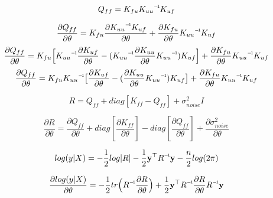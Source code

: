 \documentclass{article}
\newcommand\inv[1]{#1\raisebox{1.15ex}{$\scriptscriptstyle-\!1$}}
\begin{document}
  \begin{equation}
    Q_{ff} = K_{fu}  \inv{K_{uu}}  K_{uf}
  \end{equation}

  \begin{equation}
    \frac{\partial Q_{ff}}{\partial \theta} =
      K_{fu}  \frac{\partial {\inv{K_{uu}}  K_{uf}}}{\partial \theta} +
      {\frac{\partial K_{fu}}{\partial \theta}}  {\inv{K_{uu}}  K_{uf}}
  \end{equation}
  \begin{equation}
    \frac{\partial Q_{ff}}{\partial \theta} =
      K_{fu}  \Big[ \inv{K_{uu}}  \frac{\partial K_{uf}}{\partial \theta}  -
        (\inv{K_{uu}}  \frac{\partial K_{uu}}{\partial \theta}  \inv{K_{uu}})  K_{uf}
        \Big] +
        \frac{\partial K_{fu}}{\partial \theta}  \inv{K_{uu}}  K_{uf}
  \end{equation}
  \begin{equation}
    \frac{\partial Q_{ff}}{\partial \theta} =
      K_{fu}  \inv{K_{uu}}  \big[ \frac{\partial K_{uf}}{\partial \theta}  -
        (\frac{\partial K_{uu}}{\partial \theta}  \inv{K_{uu}})  K_{uf}
        \big] +
        \frac{\partial K_{fu}}{\partial \theta}  \inv{K_{uu}}  K_{uf}
  \end{equation}

  \begin{equation}
    R = Q_{ff} + diag[{K_{ff} - Q_{ff}}] + \sigma^{2}_{noise} I
  \end{equation}

  \begin{equation}
    \frac{\partial R}{\partial \theta} = \frac{\partial Q_{ff}}{\partial \theta}
    + diag[\frac{\partial K_{ff}}{\partial \theta}]
    - diag[\frac{\partial Q_{ff}}{\partial \theta}]
    + \frac{\partial \sigma^{2}_{noise}}{\partial \theta}
  \end{equation}

  \begin{equation}
    log(y | X) = -\frac{1}{2}log | R | -  \frac{1}{2} \textbf{y}^\top \inv{R} \textbf{y}
    - \frac{n}{2} log(2 \pi)
  \end{equation}


  \begin{equation}
    \frac{\partial log(y | X)}{\partial \theta} =
    - \frac{1}{2} tr \Big(\inv{R} \frac{{\partial R}}{\partial \theta} \Big)
    + \frac{1}{2} \textbf{y}^{\top} \inv{R} \frac{\partial R}{\partial \theta} \inv{R} \textbf{y}
  \end{equation}
\end{document}
